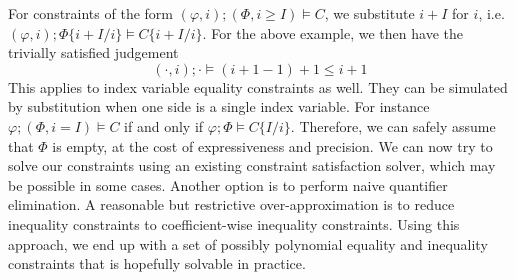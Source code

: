 For constraints of the form $(\varphi,i);(\Phi,i\geq I)\vDash C$, we substitute $i+I$ for $i$, i.e. $(\varphi,i);\Phi\{i+I/i\}\vDash C\{i+I/i\}$. For the above example, we then have the trivially satisfied judgement 
\begin{equation*}
    (\cdot,i);\cdot\vDash (i+1-1) + 1 \leq i+1
\end{equation*}
This applies to index variable equality constraints as well. They can be simulated by substitution when one side is a single index variable. For instance $\varphi;(\Phi,i=I)\vDash C$ if and only if $\varphi;\Phi\vDash C\{I/i\}$. Therefore, we can safely assume that $\Phi$ is empty, at the cost of expressiveness and precision. We can now try to solve our constraints using an existing constraint satisfaction solver, which may be possible in some cases. Another option is to perform naive quantifier elimination. A reasonable but restrictive over-approximation is to reduce inequality constraints to coefficient-wise inequality constraints. Using this approach, we end up with a set of possibly polynomial equality and inequality constraints that is hopefully solvable in practice.
%
